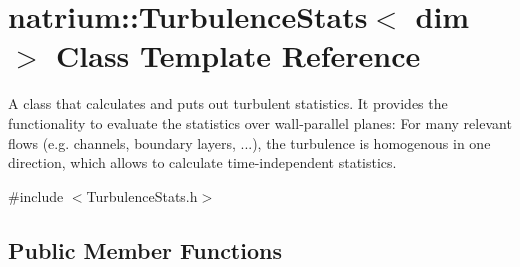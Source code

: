 \hypertarget{classnatrium_1_1TurbulenceStats}{
\section{natrium::TurbulenceStats$<$ dim $>$ Class Template Reference}
\label{classnatrium_1_1TurbulenceStats}
}


A class that calculates and puts out turbulent statistics. It provides the functionality to evaluate the statistics over wall-\/parallel planes: For many relevant flows (e.g. channels, boundary layers, ...), the turbulence is homogenous in one direction, which allows to calculate time-\/independent statistics.  


{\ttfamily \#include $<$TurbulenceStats.h$>$}\subsection*{Public Member Functions}
